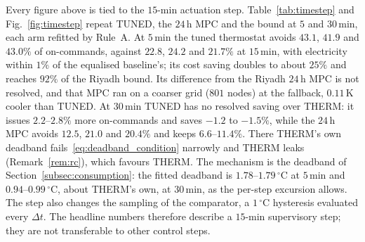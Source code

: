 \documentclass[3p,twocolumn,number]{elsarticle}
\begin{document}
Every figure above is tied to the $15$-min actuation step. Table~\ref{tab:timestep} and Fig.~\ref{fig:timestep} repeat TUNED, the $24\,$h MPC and the bound at $5$ and $30\,$min, each arm refitted by Rule~A. At $5\,$min the tuned thermostat avoids $43.1$, $41.9$ and $43.0\%$ of on-commands, against $22.8$, $24.2$ and $21.7\%$ at $15\,$min, with electricity within $1\%$ of the equalised baseline's; its cost saving doubles to about $25\%$ and reaches $92\%$ of the Riyadh bound. Its difference from the Riyadh $24\,$h MPC is not resolved, and that MPC ran on a coarser grid ($801$ nodes) at the fallback, $0.11\,$K cooler than TUNED. At $30\,$min TUNED has no resolved saving over THERM: it issues $2.2$--$2.8\%$ more on-commands and saves $-1.2$ to $-1.5\%$, while the $24\,$h MPC avoids $12.5$, $21.0$ and $20.4\%$ and keeps $6.6$--$11.4\%$. There THERM's own deadband fails~\eqref{eq:deadband_condition} narrowly and THERM leaks (Remark~\ref{rem:rc}), which favours THERM. The mechanism is the deadband of Section~\ref{subsec:consumption}: the fitted deadband is $1.78$--$1.79\,^\circ$C at $5\,$min and $0.94$--$0.99\,^\circ$C, about THERM's own, at $30\,$min, as the per-step excursion allows. The step also changes the sampling of the comparator, a $1\,^\circ$C hysteresis evaluated every $\Delta t$. The headline numbers therefore describe a $15$-min supervisory step; they are not transferable to other control steps.


\end{document}
